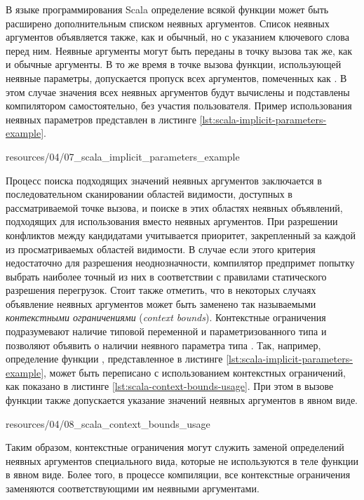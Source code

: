 В языке программирования Scala определение всякой функции может быть расширено дополнительным списком неявных аргументов. Список неявных аргументов объявляется также, как и обычный, но с указанием ключевого слова  перед ним. Неявные аргументы могут быть переданы в точку вызова так же, как и обычные аргументы. В то же время в точке вызова функции, использующей неявные параметры, допускается пропуск всех аргументов, помеченных как . В этом случае значения всех неявных аргументов будут вычислены и подставлены компилятором самостоятельно, без участия пользователя. Пример использования неявных параметров представлен в листинге \ref{lst:scala-implicit-parameters-example}. 


{resources/04/07_scala_implicit_parameters_example}

Процесс поиска подходящих значений неявных аргументов заключается в последовательном сканировании областей видимости, доступных в рассматриваемой точке вызова, и поиске в этих областях неявных объявлений, подходящих для использования вместо неявных аргументов. При разрешении конфликтов между кандидатами учитывается приоритет, закрепленный за каждой из просматриваемых областей видимости. В случае если этого критерия недостаточно для разрешения неоднозначности, компилятор предпримет попытку выбрать наиболее точный из них в соответствии с правилами статического разрешения перегрузок. Стоит также отметить, что в некоторых случаях объявление неявных аргументов может быть заменено так называемыми \emph{контекстными ограничениями} (\emph{context bounds}). Контекстные ограничения подразумевают наличие типовой переменной  и параметризованного типа  и позволяют объявить о наличии неявного параметра типа . Так, например, определение функции , представленное в листинге \ref{lst:scala-implicit-parameters-example}, может быть переписано с использованием контекстных ограничений, как показано в листинге \ref{lst:scala-context-bounds-usage}. При этом в вызове функции  также допускается указание значений неявных аргументов в явном виде. 


{resources/04/08_scala_context_bounds_usage}

Таким образом, контекстные ограничения могут служить заменой определений неявных аргументов специального вида, которые не используются в теле функции в явном виде. Более того, в процессе компиляции, все контекстные ограничения заменяются соответствующими им неявными аргументами.  


